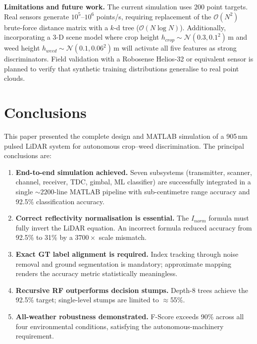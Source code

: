 \documentclass[12pt,a4paper]{article}
\begin{document}
\textbf{Limitations and future work.}  The current simulation uses 200 point targets.
Real sensors generate $10^5$--$10^6$ points/s, requiring replacement of the
$\mathcal{O}(N^2)$ brute-force distance matrix with a $k$-d tree
($\mathcal{O}(N\log N)$).  Additionally, incorporating a 3-D scene model where crop
height $h_{crop}\sim\mathcal{N}(0.3, 0.1^2)$\,m and weed height
$h_{weed}\sim\mathcal{N}(0.1, 0.06^2)$\,m will activate all five features as strong
discriminators.  Field validation with a Robosense Helios-32 or equivalent sensor is
planned to verify that synthetic training distributions generalise to real point clouds.

\section{Conclusions}
\label{sec:conclusions}

This paper presented the complete design and MATLAB simulation of a 905\,nm pulsed
LiDAR system for autonomous crop--weed discrimination.  The principal conclusions are:

\begin{enumerate}[label=\textbf{\arabic*.}]

\item \textbf{End-to-end simulation achieved.}  Seven subsystems (transmitter, scanner,
      channel, receiver, TDC, gimbal, ML classifier) are successfully integrated in a
      single $\sim\!2200$-line MATLAB pipeline with sub-centimetre range accuracy and
      92.5\% classification accuracy.

\item \textbf{Correct reflectivity normalisation is essential.}  The $I_{norm}$ formula
      must fully invert the LiDAR equation.  An incorrect formula reduced accuracy from
      92.5\% to 31\% by a $3700\times$ scale mismatch.

\item \textbf{Exact GT label alignment is required.}  Index tracking through noise
      removal and ground segmentation is mandatory; approximate mapping renders the
      accuracy metric statistically meaningless.

\item \textbf{Recursive RF outperforms decision stumps.}  Depth-8 trees achieve the
      92.5\% target; single-level stumps are limited to $\approx$55\%.

\item \textbf{All-weather robustness demonstrated.}  F-Score exceeds 90\% across all
      four environmental conditions, satisfying the autonomous-machinery requirement.

\end{enumerate}
\end{document}
